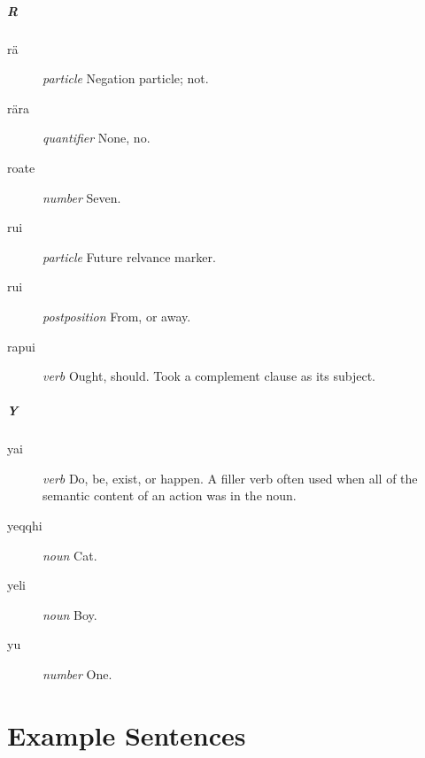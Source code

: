 \documentclass{article}
\begin{document}
\subsubsection{R}

\begin{description}
\item [r\"a] \emph{particle} Negation particle; not.
\item [r\"ara] \emph{quantifier} None, no.
\item [roate] \emph{number} Seven.
\item [rui] \emph{particle} Future relvance marker.
\item [rui] \emph{postposition} From, or away.
\item [rapui] \emph{verb} Ought, should. Took a complement clause as its subject.
\end{description}

\subsubsection{Y}

\begin{description}
\item [yai] \emph{verb} Do, be, exist, or happen.  A filler verb often used when all of the semantic content of an action was in the noun.
\item [yeqqhi] \emph{noun} Cat.
\item [yeli] \emph{noun} Boy.
\item [yu] \emph{number} One.
\end{description}

\part{Example Sentences}
\end{document}
